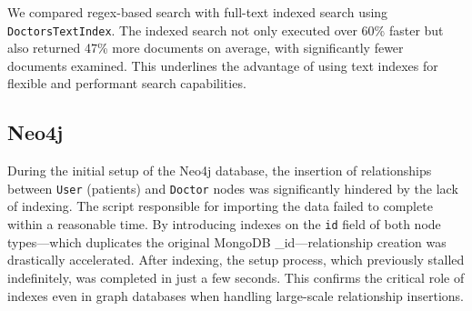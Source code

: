 We compared regex-based search with full-text indexed search using \texttt{DoctorsTextIndex}. The indexed search not only executed over 60\% faster but also returned 47\% more documents on average, with significantly fewer documents examined. This underlines the advantage of using text indexes for flexible and performant search capabilities.

\subsection{Neo4j}


During the initial setup of the Neo4j database, the insertion of relationships between \texttt{User} (patients) and \texttt{Doctor} nodes was significantly hindered by the lack of indexing. The script responsible for importing the data failed to complete within a reasonable time. By introducing indexes on the \texttt{id} field of both node types—which duplicates the original MongoDB \_id—relationship creation was drastically accelerated. After indexing, the setup process, which previously stalled indefinitely, was completed in just a few seconds. This confirms the critical role of indexes even in graph databases when handling large-scale relationship insertions.
